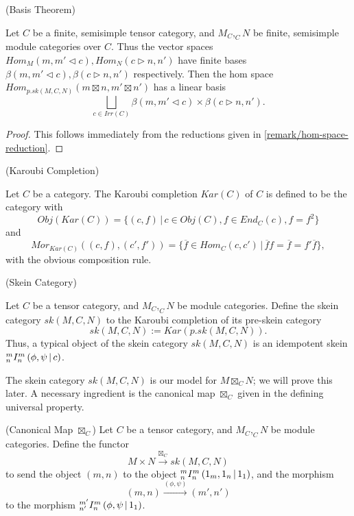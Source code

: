 \begin{proposition} (Basis Theorem) \label{proposition/basis-theorem}

  \noindent Let $C$ be a finite, semisimple tensor category, and
  $M_{C}, _{C}N$ be finite, semisimple module categories over $C$. Thus the
  vector spaces $Hom_{M}(m, m' \lhd c), Hom_{N}(c \rhd n, n')$ have finite bases
  $\beta(m, m' \lhd c), \beta(c \rhd n, n')$ respectively. Then the hom space
  $Hom_{p.sk(M,C,N)}(m \boxtimes n, m' \boxtimes n')$ has a linear basis
  \[
    \bigsqcup_{c \in Irr(C)} \beta(m, m' \lhd c) \times \beta(c \rhd n, n').
  \]
\end{proposition}
\begin{proof}
  This follows immediately from the reductions given in \ref{remark/hom-space-reduction}.
\end{proof}

\begin{definition} (Karoubi Completion)

  \noindent Let $C$ be a category. The Karoubi completion $Kar(C)$ of $C$ is defined to be the category with
  \[
    Obj(Kar(C)) = \{(c, f) \,|\, c \in Obj(C), f \in End_{C}(c), f = f^{2}\}
  \] and
  \[
    Mor_{Kar(C)}((c,f), (c', f')) = \{\overline{f} \in Hom_{C}(c,c') \,|\, \overline{f}f = \overline{f} = f'\overline{f}\},
  \]
  with the obvious composition rule.
\end{definition}

\begin{definition} (Skein Category)

  \noindent Let $C$ be a tensor category, and $M_{C}, _{C}N$ be module categories.
  Define the skein category $sk(M,C,N)$ to the Karoubi completion of its pre-skein category
  \[
    sk(M,C,N) := Kar(p.sk(M,C,N)).
  \]
  \noindent Thus, a typical object of the skein category $sk(M,C,N)$ is an
  idempotent skein ${}^{m}_{n} I^{m}_{n} \left( \phi, \psi \,\middle|\, c \right)$.
\end{definition}

\noindent The skein category $sk(M,C,N)$ is our model for $M \boxtimes_{C} N$;
we will prove this later. A necessary ingredient is the canonical map
$\boxtimes_{C}$ given in the defining universal property.

\begin{definition}\label{definition/canonical-map} (Canonical Map $\boxtimes_{C}$)
  \noindent Let $C$ be a tensor category, and $M_{C}, _{C}N$ be module categories. Define the functor
  \[
    M \times N \xrightarrow{\boxtimes_{C}} sk(M,C,N)
  \]
  to send the object $(m,n)$ to the object ${}^{m}_{n} I^{m}_{n} \left( 1_{m}, 1_{n} \,\middle|\, 1_{1} \right)$, and the morphism
  \[
    (m,n) \xrightarrow{(\phi, \psi)} (m', n')
  \]
  to the morphism ${}^{m'}_{n'} I^{m}_{n} \left( \phi, \psi \,\middle|\, 1_{1} \right)$.
\end{definition}


